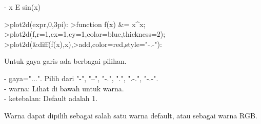 \documentclass[a4paper,10pt]{article}
\begin{document}
\begin{eulernotebook}
\begin{eulercomment}
\begin{eulercomment}
\begin{eulercomment}
\begin{eulercomment}
\begin{eulercomment}
\begin{eulercomment}
\begin{euleroutput}
                                - x
                               E    sin(x)
  
\end{euleroutput}
\begin{eulerprompt}
>plot2d(expr,0,3pi):
>function f(x) &= x^x;
>plot2d(f,r=1,cx=1,cy=1,color=blue,thickness=2);
>plot2d(&diff(f(x),x),>add,color=red,style="-.-"):
\end{eulerprompt}
\begin{eulercomment}
Untuk gaya garis ada berbagai pilihan.

- gaya="...". Pilih dari "-", "--", "-.", ".", ".-.", "-.-".\\
- warna: Lihat di bawah untuk warna.\\
- ketebalan: Default adalah 1.

Warna dapat dipilih sebagai salah satu warna default, atau sebagai
warna RGB.


\end{eulercomment}
\end{eulercomment}
\end{eulercomment}
\end{eulercomment}
\end{eulercomment}
\end{eulercomment}
\end{eulercomment}
\end{eulernotebook}
\end{document}

